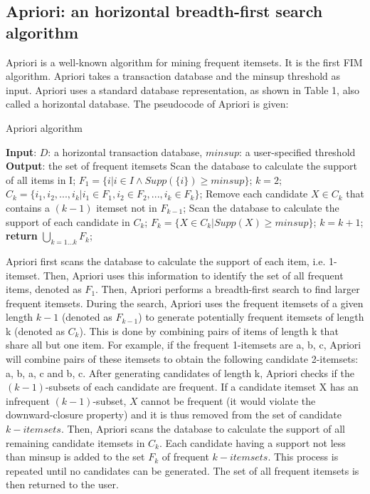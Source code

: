 \subsection{Apriori: an horizontal breadth-first search algorithm}
Apriori\cite{apriori} is a well-known algorithm for mining frequent itemsets.
It is the first FIM algorithm. Apriori takes a transaction database and the minsup
threshold as input. Apriori uses a standard database representation, as shown in Table
1, also called a horizontal database. The pseudocode of Apriori is given:

\begin{algorithm}
    \caption{Apriori algorithm}
    \begin{algorithmic}[1]
        \State \textbf{Input}: $D$: a horizontal transaction database, $minsup$: a user-specified threshold
        \State \textbf{Output}: the set of frequent itemsets
        \State Scan the database to calculate the support of all items in I;
        \State $F_1 = \{i | i \in I \wedge Supp(\{i\}) \ge minsup\}$; 
        \State $k = 2$;
        \State $C_k = \{i_1, i_2, ..., i_k | i_1 \in F_1, i_2 \in F_2, ..., i_k \in F_k\}$; 
        \State Remove each candidate $X \in C_k$ that contains a $(k-1)$ itemset not in $F_{k-1}$;
        \State Scan the database to calculate the support of each candidate in $C_k$;
        \State $F_k = \{X \in C_k | Supp(X) \ge minsup\}$; 
        \State $k = k + 1$;
        \EndWhile
        \State \textbf{return} $\bigcup_{k=1...k} F_k$;
    \end{algorithmic}
\end{algorithm}

Apriori first scans the database to calculate the support of each item, i.e. 1-itemset.
Then, Apriori uses this information to identify the set of all frequent items, denoted as $F_1$.
Then, Apriori performs a breadth-first search to find larger frequent itemsets.
During the search, Apriori uses the frequent itemsets of a given length $k - 1$
(denoted as $F_{k-1}$) to generate potentially frequent itemsets of length k (denoted as $C_k$). This
is done by combining pairs of items of length k that share all but one item.
For example, if the frequent 1-itemsets are {a}, {b}, {c}, Apriori will combine pairs of
these itemsets to obtain the following candidate 2-itemsets: {a, b}, {a, c} and {b, c}.
After generating candidates of length k, Apriori checks if the $(k - 1)$-subsets of
each candidate are frequent. If a candidate itemset X has an infrequent $(k - 1)$-subset, $X$
cannot be frequent (it would violate the downward-closure property) and it is thus removed
from the set of candidate $k-itemsets$.
Then, Apriori scans the database to calculate the
support of all remaining candidate itemsets in $C_k$. Each candidate having a support
not less than minsup is added to the set $F_k$ of frequent $k-itemsets$. This process
is repeated until no candidates can be generated. The set of all frequent itemsets is then
returned to the user.

